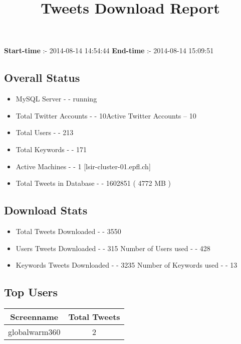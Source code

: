 \documentclass{article}\usepackage[T1]{fontenc}
\begin{document}
\title{\textbf{Tweets Download Report}}
               \date{}
                \maketitle
               \centerline{\textbf{Start-time} :- 2014-08-14 14:54:44 \hspace{40pt} \textbf{End-time} :- 2014-08-14 15:09:51}               \subsection*{Overall Status}                \begin{itemize}                \item MySQL Server - - running               \item Total Twitter Accounts - - 10\newline Active Twitter Accounts -- 10               \item Total Users - - 213               \item Total Keywords - - 171               \item Active Machines - - 1 [lsir-cluster-01.epfl.ch]               \item Total Tweets in Database - - 1602851 ( 4772 MB )               \end{itemize}               \subsection*{Download Stats}                \begin{itemize}                \item Total Tweets Downloaded - - 3550               \item Users Tweets Downloaded - - 315 \newline Number of Users used - - 428               \item Keywords Tweets Downloaded - - 3235 \newline Number of Keywords used - - 13              \end{itemize}              \subsection*{Top Users}\begin{tabular}{|c|c|}         \hline         Screenname & Total Tweets \\ 
 \hline
globalwarm360 & 2\\ 
 \hline

\end{tabular}
\end{document}
